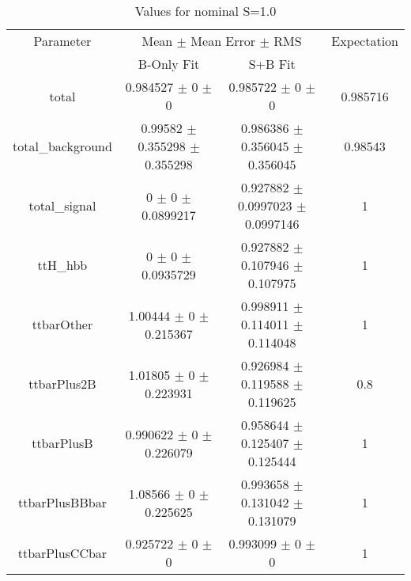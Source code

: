\begin{table}
\centering
\caption{Values for nominal S=1.0}
\begin{tabular}{cccc}
\toprule
Parameter & \multicolumn{2}{c}{Mean $\pm$ Mean Error $\pm$ RMS} & Expectation\\
 & B-Only Fit & S+B Fit & \\
\midrule
total & \num{0.984527} $\pm$ \num{0} $\pm$ \num{0} & \num{0.985722} $\pm$ \num{0} $\pm$ \num{0} & \num{0.985716}\\
total\_background & \num{0.99582} $\pm$ \num{0.355298} $\pm$ \num{0.355298} & \num{0.986386} $\pm$ \num{0.356045} $\pm$ \num{0.356045} & \num{0.98543}\\
total\_signal & \num{0} $\pm$ \num{0} $\pm$ \num{0.0899217} & \num{0.927882} $\pm$ \num{0.0997023} $\pm$ \num{0.0997146} & \num{1}\\
ttH\_hbb & \num{0} $\pm$ \num{0} $\pm$ \num{0.0935729} & \num{0.927882} $\pm$ \num{0.107946} $\pm$ \num{0.107975} & \num{1}\\
ttbarOther & \num{1.00444} $\pm$ \num{0} $\pm$ \num{0.215367} & \num{0.998911} $\pm$ \num{0.114011} $\pm$ \num{0.114048} & \num{1}\\
ttbarPlus2B & \num{1.01805} $\pm$ \num{0} $\pm$ \num{0.223931} & \num{0.926984} $\pm$ \num{0.119588} $\pm$ \num{0.119625} & \num{0.8}\\
ttbarPlusB & \num{0.990622} $\pm$ \num{0} $\pm$ \num{0.226079} & \num{0.958644} $\pm$ \num{0.125407} $\pm$ \num{0.125444} & \num{1}\\
ttbarPlusBBbar & \num{1.08566} $\pm$ \num{0} $\pm$ \num{0.225625} & \num{0.993658} $\pm$ \num{0.131042} $\pm$ \num{0.131079} & \num{1}\\
ttbarPlusCCbar & \num{0.925722} $\pm$ \num{0} $\pm$ \num{0} & \num{0.993099} $\pm$ \num{0} $\pm$ \num{0} & \num{1}\\
\bottomrule
\end{tabular}
\end{table}